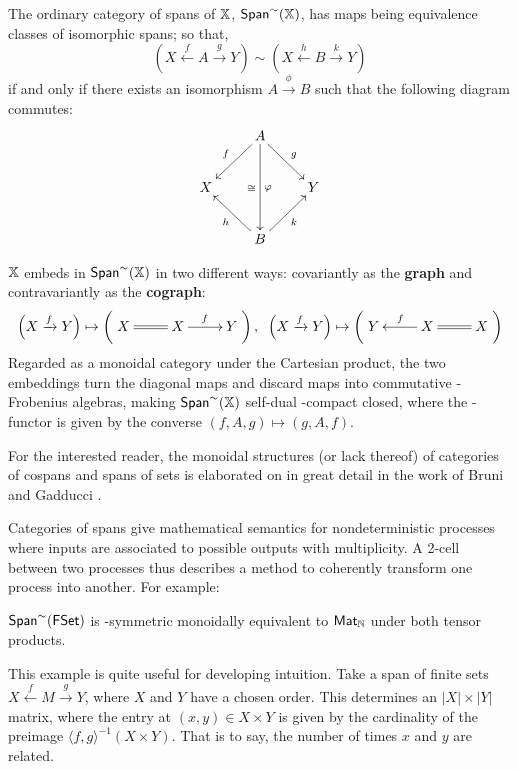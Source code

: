 \begin{definition}
The ordinary category of spans of $\mathbb{X}$, $\mathsf{Span}^\sim(\mathbb{X})$, has maps being equivalence classes of isomorphic spans; so that,
$$
(X\xleftarrow{f} A \xrightarrow{g} Y)
 \sim
(X\xleftarrow{h} B \xrightarrow{k} Y)
$$
if and only if there exists an isomorphism $A\xrightarrow{\phi} B$ such that the following diagram commutes:
$$
\xymatrix{
    & A \ar[dl]_{f} \ar[dr]^{g} \ar[dd]^{\phi}_{\cong}
    &
  \\X 
    &
    & Y
  \\
    & B \ar[ul]^{h} \ar[ur]_{k}
    &
}
$$
\end{definition}
$\mathbb{X}$ embeds in $\mathsf{Span}^\sim(\mathbb{X})$ in two different ways: covariantly as the {\bf graph} and contravariantly as the {\bf cograph}:
$$
\left(X\xrightarrow{f} Y \right) 
\mapsto
\left( 
\xymatrix{
X & X\ar@{=}[l] \ar[r]^{f} & Y
}
\right)
,\hspace*{.2cm}
\left(X\xrightarrow{f} Y \right) 
\mapsto
\left( 
\xymatrix{
Y & X \ar@{=}[r] \ar[l]_f & X
}
\right)
$$
 Regarded as a monoidal category under the Cartesian product, the two embeddings turn the diagonal maps and discard maps into commutative \dag-Frobenius algebras, making  $\mathsf{Span}^\sim(\mathbb{X})$  self-dual \dag-compact closed, where the \dag-functor is given by the converse  $(f,A,g)\mapsto (g,A,f)$.

For the interested reader, the monoidal structures (or lack thereof) of categories of cospans and spans of sets is elaborated on in great detail in the work of Bruni and Gadducci \cite{bruni}.

Categories of spans give mathematical semantics for nondeterministic processes where inputs are associated to possible outputs with multiplicity. 
A 2-cell between two processes thus describes a method to coherently transform one process into another.  For example:
\begin{example}
$\mathsf{Span}^\sim(\mathsf{FSet})$ is \dag-symmetric monoidally equivalent to $\mathsf{Mat}_{\mathbb{N}}$ under both tensor products.
\end{example}
This example is quite useful for developing intuition.  Take a span of finite sets $X\xleftarrow{f} M \xrightarrow{g} Y$, where $X$ and $Y$ have a chosen order. This determines an $|X|\times |Y|$ matrix, where the entry at $(x,y)\in X\times Y$ is given by the cardinality of the preimage $\langle f,g\rangle^{-1}(X\times Y)$.  That is to say, the number of times $x$ and $y$ are related.



